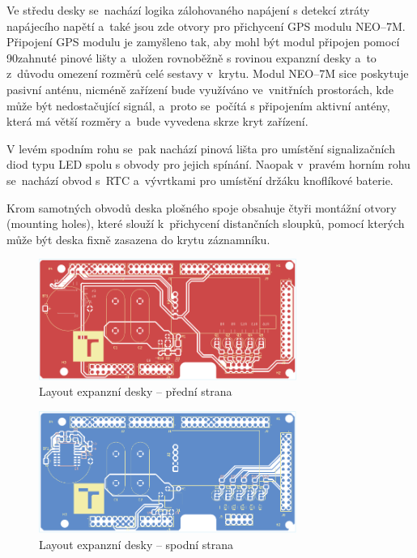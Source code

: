 Ve středu desky se~nachází logika zálohovaného napájení s detekcí ztráty napájecího napětí a~také jsou zde otvory pro přichycení GPS modulu NEO--7M. Připojení GPS modulu je zamyšleno tak, aby mohl být modul připojen pomocí 90\textdegree zahnuté pinové lišty a~uložen rovnoběžně s rovinou expanzní desky a~to z~důvodu omezení rozměrů celé sestavy v~krytu. Modul NEO--7M sice poskytuje pasivní anténu, nicméně zařízení bude využíváno ve~vnitřních prostorách, kde může být nedostačující signál, a~proto se~počítá s připojením aktivní antény, která má větší rozměry a~bude vyvedena skrze kryt zařízení. 

V levém spodním rohu se~pak nachází pinová lišta pro umístění signalizačních diod typu LED spolu s obvody pro jejich spínání. Naopak v~pravém horním rohu se~nachází obvod s~RTC a~vývrtkami pro umístění držáku knoflíkové baterie.

Krom samotných obvodů deska plošného spoje obsahuje čtyři montážní otvory (mounting holes), které slouží k~přichycení distančních sloupků, pomocí kterých může být deska fixně zasazena do krytu záznamníku.

\begin{figure}[h]
    \centering
    \includegraphics[width=0.75\textwidth]{obrazky-figures/extension_shield-brd-front.pdf}
    
    \caption{Layout expanzní desky -- přední strana}
    \label{fig:layout-front}
\end{figure}

\begin{figure}[h]
    \centering
    \includegraphics[width=0.75\textwidth]{obrazky-figures/extension_shield-brd-back.pdf}
    
    \caption{Layout expanzní desky -- spodní strana}
    \label{fig:layout-back}
\end{figure}

